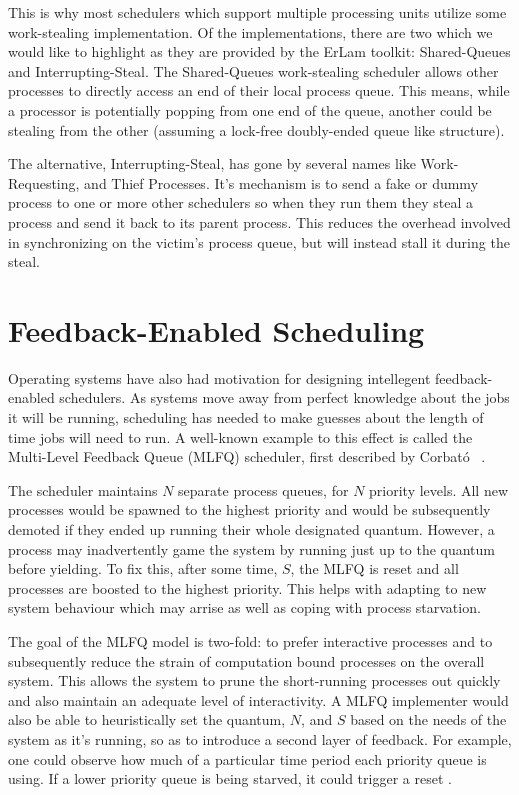 This is why most schedulers which support multiple processing units utilize 
some work-stealing implementation. Of the implementations, there are two which 
we would like to highlight as they are provided by the ErLam toolkit: 
Shared-Queues and Interrupting-Steal. The Shared-Queues work-stealing scheduler
allows other processes to directly access an end of their local process queue. 
This means, while a processor is potentially popping from one end of the queue,
another could be stealing from the other (assuming a lock-free doubly-ended 
queue like structure).

The alternative, Interrupting-Steal, has gone by several names like 
Work-Requesting, and Thief Processes. It's mechanism is to send a fake or 
dummy process to one or more other schedulers so when they run them they steal
a process and send it back to its parent process. This reduces the overhead 
involved in synchronizing on the victim's process queue, but will instead stall
it during the steal.


\section{Feedback-Enabled Scheduling}

Operating systems have also had motivation for designing intellegent 
feedback-enabled schedulers. As systems move away from perfect knowledge about 
the jobs it will be running, scheduling has needed to make guesses about the 
length of time jobs will need to run. A well-known example to this effect is
called the Multi-Level Feedback Queue (MLFQ) scheduler, first described by 
Corbat{\'o} \etal~\cite{corbato1962experimental,ArpaciDusseau14Book}.

The scheduler maintains $N$ separate process queues, for $N$ priority levels. 
All new processes would be spawned to the highest priority and would be 
subsequently demoted if they ended up running their whole designated quantum. 
However, a process may inadvertently game the system by running just up to the
quantum before yielding. To fix this, after some time, $S$, the MLFQ is reset 
and all processes are boosted to the highest priority. This helps with adapting 
to new system behaviour which may arrise as well as coping with process 
starvation.

The goal of the MLFQ model is two-fold: to prefer interactive processes and 
to subsequently reduce the strain of computation bound processes on the overall 
system. This allows the system to prune the short-running processes out quickly
and also maintain an adequate level of interactivity. A MLFQ implementer would 
also be able to heuristically set the quantum, $N$, and $S$ based on the needs 
of the system as it's running, so as to introduce a second layer of feedback. 
For example, one could observe how much of a particular time period each
priority queue is using. If a lower priority queue is being starved, it could
trigger a reset \cite{hoganson2009reducing}.

